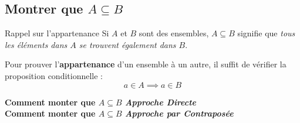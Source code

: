 \documentclass[16pt]{report}
\begin{document}
\begin{multicols*}{2}
            
            \section{\textcolor{myp}{\textbf{Montrer que $A \subseteq B$}}} 

            
            \begin{Definitionx}{Rappel sur l'appartenance}{}
                Si $A$ et $B$ sont des ensembles, $ A \subseteq B $ signifie que \textit{tous les éléments dans $A$ se 
                trouvent également dans $B$}.             
            \end{Definitionx}
                Pour prouver l'\textbf{appartenance} d'un ensemble à un autre, il suffit de vérifier la 
                proposition conditionnelle :
                            \[ a \in A \implies  a \in B \]


            \begin{center}
            \textbf{Comment monter que $A \subseteq B$ \textit{Approche Directe}} 
            \noindent{}
            \vspace{2em} \\
            \textbf{Comment monter que $A \subseteq B$ \textit{Approche par Contraposée}} 
            \noindent{}
            \end{center} 




\end{multicols*}
\end{document}
